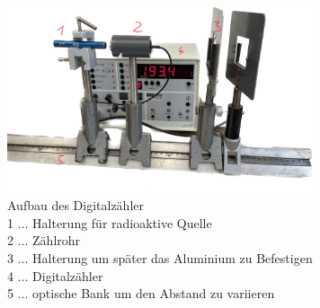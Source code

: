 \documentclass[12pt,english,ngerman]{scrartcl}
\begin{document}
\begin{figure}[H]
    \begin{center}
		\includegraphics[width=0.8\textwidth]{./figures/digz.png}
	\end{center}
	\caption{Aufbau des Digitalzähler \\ 1 $\dots$ Halterung für radioaktive Quelle\\ 2 $\dots$ Zählrohr 
    \\3 $\dots$ Halterung um später das Aluminium zu Befestigen \\ 4 $\dots$ Digitalzähler 
    \\ 5 $\dots$ optische Bank um den Abstand zu variieren}
	\label{fig:digz}
    
\end{figure}










\newpage

\printbibliography
\listoffigures
\listoftables
\end{document}
